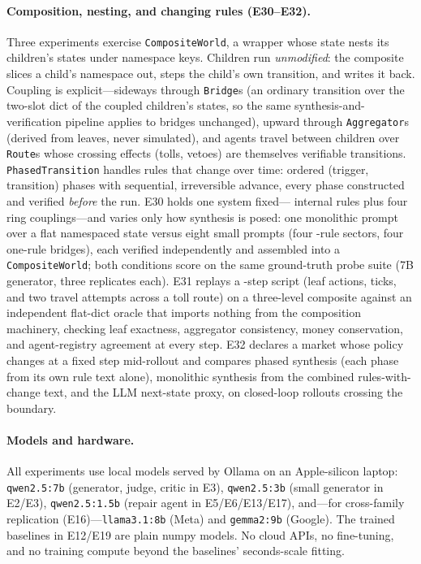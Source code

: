 \documentclass[11pt]{article}
\begin{document}
\paragraph{Composition, nesting, and changing rules (E30--E32).} Three
experiments exercise \texttt{CompositeWorld}, a wrapper whose state nests its
children's states under namespace keys. Children run \emph{unmodified}: the
composite slices a child's namespace out, steps the child's own transition,
and writes it back. Coupling is explicit---sideways through \texttt{Bridge}s
(an ordinary transition over the two-slot dict of the coupled children's
states, so the same synthesis-and-verification pipeline applies to bridges
unchanged), upward through \texttt{Aggregator}s (derived from leaves, never
simulated), and agents travel between children over \texttt{Route}s whose
crossing effects (tolls, vetoes) are themselves verifiable transitions.
\texttt{PhasedTransition} handles rules that change over time: ordered
(trigger, transition) phases with sequential, irreversible advance, every
phase constructed and verified \emph{before} the run. E30 holds one system
fixed---\CompRules{} internal rules plus four ring couplings---and varies
only how synthesis is posed: one monolithic prompt over a flat namespaced
state versus eight small prompts (four \CompChildRules-rule sectors, four
one-rule bridges), each verified independently and assembled into a
\texttt{CompositeWorld}; both conditions score on the same ground-truth probe
suite (7B generator, three replicates each). E31 replays a \NestSteps-step
script (leaf actions, ticks, and two travel attempts across a toll route) on
a three-level composite against an independent flat-dict oracle that imports
nothing from the composition machinery, checking leaf exactness, aggregator
consistency, money conservation, and agent-registry agreement at every step.
E32 declares a market whose policy changes at a fixed step mid-rollout and
compares phased synthesis (each phase from its own rule text alone),
monolithic synthesis from the combined rules-with-change text, and the LLM
next-state proxy, on closed-loop rollouts crossing the boundary.

\paragraph{Models and hardware.} All experiments use local models served by
Ollama on an Apple-silicon laptop: \texttt{qwen2.5:7b} (generator, judge,
critic in E3), \texttt{qwen2.5:3b} (small generator in E2/E3),
\texttt{qwen2.5:1.5b} (repair agent in E5/E6/E13/E17), and---for
cross-family replication (E16)---\texttt{llama3.1:8b} (Meta) and
\texttt{gemma2:9b} (Google). The trained baselines in E12/E19 are plain
numpy models. No cloud APIs, no fine-tuning, and no training compute beyond
the baselines' seconds-scale fitting.
\end{document}
